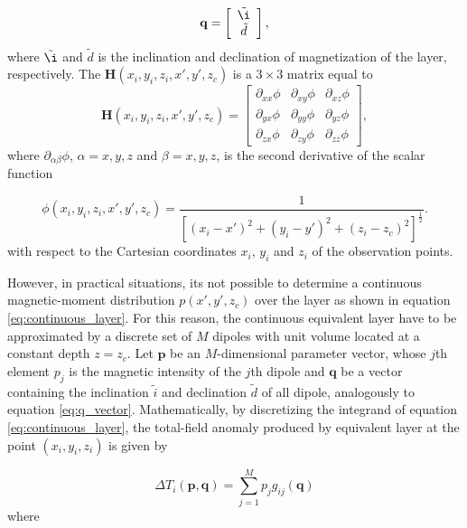 \begin{equation}
	\mathbf{q} =
	\left[ \begin{array}{c}
		\tilde{\i} \\ 
		\tilde{d} 
	\end{array} \right] ,
	\label{eq:q_vector}
\end{equation}
where $\tilde{\i} $ and $\tilde{d} $ is the inclination and declination of magnetization of the layer, respectively. The $\mathbf{H}(x_i,y_i,z_i,x',y',z_c)$ is a $3 \times 3$ matrix equal to  
\begin{equation}
   \mathbf{H}(x_i,y_i,z_i,x',y',z_c) =
   \left[ \begin{array}{ccc}
   \partial_{xx} \phi & \partial_{xy} \phi &\partial_{xz} \phi \\  \partial_{yx} \phi & \partial_{yy} \phi &\partial_{yz} \phi \\  \partial_{zx} \phi &\partial_{zy}\phi  & \partial_{zz} \phi    
   \end{array} \right] ,
   \label{eq:H}
\end{equation}
where $\partial_{\alpha \beta} \phi$, $\alpha = x, y, z$ and $\beta = x, y, z$, is the second derivative of the scalar function 

\begin{equation}
   \phi (x_i,y_i,z_i,x',y',z_c) = \frac{1}{[(x_i-x')^2 + (y_i-y')^2 + (z_i-z_c)^2]^{\frac{1}{2}}} .
   \label{eq:phi}
 \end{equation}
with respect to the Cartesian coordinates $x_i$, $y_i$ and $z_i$ of the observation points.  


However, in practical situations, its not possible to determine a continuous magnetic-moment distribution $p(x',y',z_c)$ over the layer as shown in equation \ref{eq:continuous_layer}. For this reason, the continuous equivalent layer have to be approximated  by a discrete set of $M$ dipoles with unit volume located at a constant depth $z = z_c$. Let $\mathbf{p}$ be an $M$-dimensional parameter vector, whose $j$th element $p_j$ is the magnetic intensity of the $j$th dipole and $\mathbf{q}$ be a vector containing the inclination $\tilde{i}$ and declination $\tilde{d}$ of all dipole, analogously to equation \ref{eq:q_vector}. Mathematically, by discretizing the integrand of equation \ref{eq:continuous_layer}, the total-field anomaly produced by equivalent layer at the point $(x_i,y_i,z_i)$ is given by     

\begin{equation}
\Delta T_i (\mathbf{p},\mathbf{q}) = \sum_{j=1}^{M} p_j g_{ij} (\mathbf{q})
\label{eq:tfa_pred_pos_i}
\end{equation}    
where 

